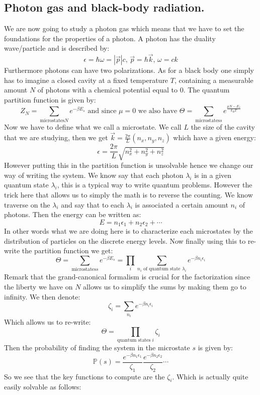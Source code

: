 \documentclass[10pt,a4paper]{book}
\begin{document}
\subsection{Photon gas and black-body radiation.}
We are now going to study a photon gas which means that we have to set the foundations for the properties of a photon. A photon has the duality wave/particle and is described by:
\[
\epsilon = \hbar \omega = |\vec{p}| c, \, \vec{p} = \hbar \vec{k},\, \omega = c k
\]
Furthermore photons can have two polarizations. As for a black body one simply has to imagine a closed cavity at a fixed temperature $T$, containing a measurable amount $N$ of photons with a chemical potential equal to 0. The quantum partition function is given by:
\[
Z_N = \sum_{\text{microstates} N} e^{-\beta E_s} \text{ and since } \mu =0 \text{ we also have } \Theta = \sum_{\text{microstates} s} e^{\frac{\mu N - E_s}{k_B T}}
\] 
Now we have to define what we call a microstate. We call $L$ the size of the cavity that we are studying, then we get $\vec{k} = \frac{2 \pi}{L} (n_x, n_y, n_z)$ which have a given energy:
\[
\epsilon = \frac{2\pi}{L} \sqrt{n_x^2 + n_y^2 + n_z^2}
\]
However putting this in the partition function is unsolvable hence we change our way of writing the system. We know say that each photon $\lambda_i $ is in a given quantum state $\lambda_i$, this is a typical way to write quantum problems. However the trick here that allows us to simply the math is to reverse the counting. We know traverse on the $\lambda_i$ and say that to each $\lambda_i$ is associated a certain amount $n_i$ of photons. Then the energy can be written as:
\[
E = n_1 \epsilon_1 + n_2 \epsilon_2 + \cdots
\]
In other words what we are doing here is to characterize each microstates by the distribution of particles on the discrete energy levels. Now finally using this to re-write the partition function we get:
\[
\Theta = \sum_{\text{microstates} s} e^{-\beta E_s} = \prod_{i} \sum_{n_i \text{ of quantum state } \lambda_i} e^{-\beta n_i \epsilon_i}
\]
Remark that the grand-canonical formalism is crucial for the factorization since the liberty we have on $N$ allows us to simplify the sums by making them go to infinity. We then denote:
\[
\zeta_i = \sum_{n_i} e^{-\beta n_i \epsilon_i}
\]
Which allows us to re-write:
\[
\Theta = \prod_{\text{quantum states } i} \zeta_i
\]
Then the probability of finding the system in the microstate $s$ is given by:
\[
\mathbb{P}(s) = \frac{e^{-\beta n_1 \epsilon_1}}{\zeta_1} \frac{e^{-\beta n_2 \epsilon_2}}{\zeta_2} \cdots
\]
So we see that the key functions to compute are the $\zeta_i$. Which is actually quite easily solvable as follows:
\end{document}
